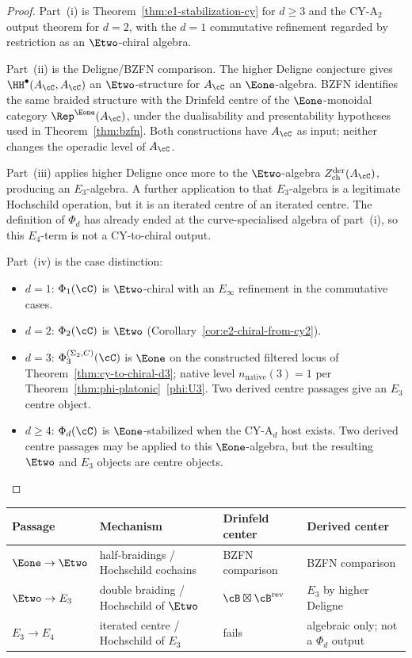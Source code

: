 \begin{proof}
Part~(i) is Theorem~\ref{thm:e1-stabilization-cy} for \(d\geq3\) and the CY-A$_2$ output theorem for \(d=2\), with the \(d=1\) commutative refinement regarded by restriction as an \(\Etwo\)-chiral algebra.

Part~(ii) is the Deligne/BZFN comparison. The higher Deligne conjecture gives \(\HH^\bullet(A_\cC,A_\cC)\) an \(\Etwo\)-structure for \(A_\cC\) an \(\Eone\)-algebra. BZFN identifies the same braided structure with the Drinfeld centre of the \(\Eone\)-monoidal category \(\Rep^{\Eone}(A_\cC)\), under the dualisability and presentability hypotheses used in Theorem~\ref{thm:bzfn}. Both constructions have \(A_\cC\) as input; neither changes the operadic level of \(A_\cC\).

Part~(iii) applies higher Deligne once more to the \(\Etwo\)-algebra \(Z^{\mathrm{der}}_{\mathrm{ch}}(A_\cC)\), producing an \(E_3\)-algebra. A further application to that \(E_3\)-algebra is a legitimate Hochschild operation, but it is an iterated centre of an iterated centre. The definition of \(\Phi_d\) has already ended at the curve-specialised algebra of part~(i), so this \(E_4\)-term is not a CY-to-chiral output.

Part~(iv) is the case distinction:
\begin{itemize}
 \item $d = 1$: $\Phi_1(\cC)$ is $\Etwo$-chiral with an $E_\infty$ refinement in the commutative cases.
 \item $d = 2$: $\Phi_2(\cC)$ is $\Etwo$ (Corollary~\ref{cor:e2-chiral-from-cy2}).
 \item $d = 3$: $\Phi_3^{(\Sigma_2,C)}(\cC)$ is $\Eone$ on the constructed filtered locus of Theorem~\ref{thm:cy-to-chiral-d3}; native level $n_{\mathrm{native}}(3) = 1$ per Theorem~\ref{thm:phi-platonic}~\ref{phi:U3}. Two derived centre passages give an \(E_3\) centre object.
 \item $d \geq 4$: $\Phi_d(\cC)$ is $\Eone$-stabilized when the CY-A$_d$ host exists. Two derived centre passages may be applied to this \(\Eone\)-algebra, but the resulting \(\Etwo\) and \(E_3\) objects are centre objects.
\end{itemize}
\end{proof}

\begin{center}
\renewcommand{\arraystretch}{1.3}
\small
\begin{tabular}{llll}
 \toprule
 Passage & Mechanism & Drinfeld center & Derived center \\
 \midrule
 $\Eone \to \Etwo$ & half-braidings / Hochschild cochains & BZFN comparison & BZFN comparison \\
 $\Etwo \to E_3$ & double braiding / Hochschild of $\Etwo$ & $\cB \boxtimes \cB^{\mathrm{rev}}$ & $E_3$ by higher Deligne \\
 $E_3 \to E_4$ & iterated centre / Hochschild of $E_3$ & fails & algebraic only; not a $\Phi_d$ output \\
 \bottomrule
\end{tabular}
\end{center}

